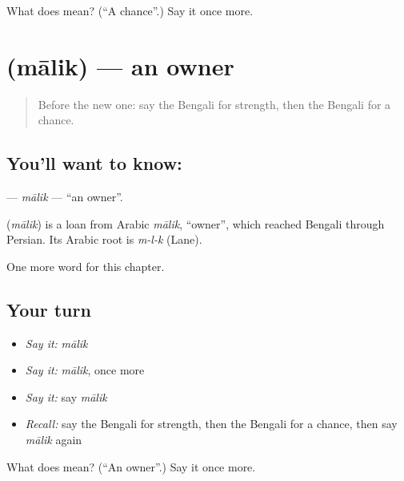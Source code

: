 \begin{tcolorbox}[breakable,colback=teal!4,colframe=teal!35!black,title={Before you move on}]
What does  mean? (\textquotedblleft{}A chance\textquotedblright{}.) Say it once more.
\end{tcolorbox}
\section[\texorpdfstring{\bn{মালিক} (mālik)}{মালিক (mālik)}]{ (mālik) — an owner}

\label{lesson:BN-C98-malik}



\begin{quote}
Before the new one: say the Bengali for strength, then the Bengali for a chance.
\end{quote}

\subsection*{You'll want to know: }
\textbf{} — \emph{mālik} — \textquotedblleft{}an owner\textquotedblright{}.

\begin{cousinweb}
\textbf{} (\emph{mālik}) is a loan from Arabic \emph{mālik}, \textquotedblleft{}owner\textquotedblright{}, which reached Bengali through Persian. Its Arabic root is \emph{m-l-k} (Lane).
\end{cousinweb}

\begin{grammarlens}[title={What you've built}]
One more word for this chapter.
\end{grammarlens}

\subsection*{Your turn}
\begin{itemize}
\raggedright
  \item \emph{Say it:} \emph{mālik}
  \item \emph{Say it:} \emph{mālik}, once more
  \item \emph{Say it:} say \emph{mālik}
  \item \emph{Recall:} say the Bengali for strength, then the Bengali for a chance, then say \emph{mālik} again
\end{itemize}

\begin{tcolorbox}[breakable,colback=teal!4,colframe=teal!35!black,title={Before you move on}]
What does  mean? (\textquotedblleft{}An owner\textquotedblright{}.) Say it once more.
\end{tcolorbox}
